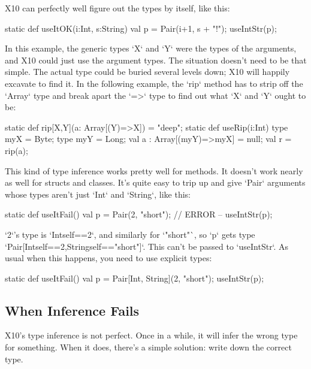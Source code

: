 X10 can perfectly well figure out the types by itself, like this: 
\begin{xtennum}[]
static def useItOK(i:Int, s:String) {
  val p = Pair(i+1, s + "!");
  useIntStr(p);
}
\end{xtennum}

In this example, the generic types \xcd`X` and \xcd`Y` were the types of the
arguments, and X10 could just use the argument types.  The situation doesn't
need to be that simple.  The actual type could be buried several levels down;
X10 will happily excavate to find it.
In the following example, the \xcd`rip` method has to strip off the
\xcd`Array` type and break apart the \xcd`=>` type to find out what \xcd`X`
and \xcd`Y` ought to be: 
\begin{xtennum}[]
static def rip[X,Y](a: Array[(Y)=>X]) = "deep";
static def useRip(i:Int){
   type myX = Byte;
   type myY = Long;
   val a : Array[(myY)=>myX] = null;
   val r = rip(a);
}

\end{xtennum}

This kind of type inference works pretty well for methods.  It doesn't work
nearly as well for structs and classes.  It's quite easy to trip up and give
\xcd`Pair` arguments whose types aren't just \xcd`Int` and \xcd`String`, like
this: 
\begin{xtennum}[]
static def useItFail(){
  val p = Pair(2, "short");
  // ERROR --  useIntStr(p);
}
\end{xtennum}
\xcd`2`'s type is \xcd`Int{self==2}`, and similarly for \xcd`"short"`, so 
\xcd`p` gets type \xcd`Pair[Int{self==2},String{self=="short"}]`.  This can't
be passed to \xcd`useIntStr`.  As usual when this happens, you need to use
explicit types: 
\begin{xtennum}[]
static def useItFail(){
  val p = Pair[Int, String](2, "short");
  useIntStr(p);
}
\end{xtennum}


\subsection{When Inference Fails}
X10's type inference is not perfect.  Once in a while, it will infer the wrong
type for something.  When it does, there's a simple solution: write down the
correct type.

